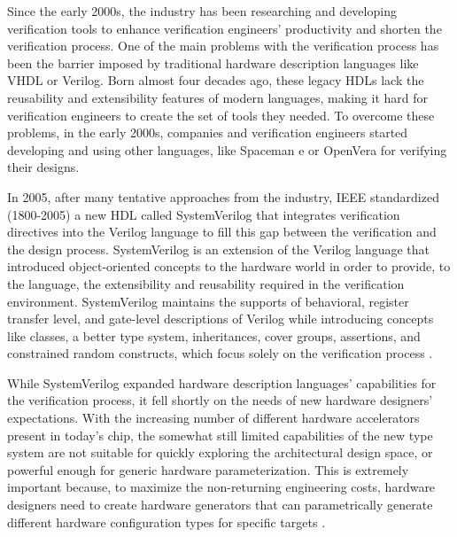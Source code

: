 Since the early 2000s, the industry has been researching and developing
verification tools to enhance verification engineers' productivity and shorten
the verification process. One of the main problems with the verification process
has been the barrier imposed by traditional hardware description languages like
VHDL or Verilog. Born almost four decades ago, these legacy HDLs lack the
reusability and extensibility features of modern languages, making it hard for
verification engineers to create the set of tools they needed. To overcome these
problems, in the early 2000s, companies and verification engineers started
developing and using other languages, like Spaceman e \cite{ieee-e2019} or
OpenVera \cite{openverapapaer} for verifying their designs.

In 2005, after many tentative approaches from the industry, IEEE standardized
(1800-2005) a new HDL called SystemVerilog that integrates verification
directives into the Verilog language to fill this gap between the verification
and the design process. SystemVerilog is an extension of the Verilog language
that introduced object-oriented concepts to the hardware world in order to
provide, to the language, the extensibility and reusability required in the
verification environment. SystemVerilog maintains the supports of behavioral,
register transfer level, and gate-level descriptions of Verilog while
introducing concepts like classes, a better type system, inheritances, cover
groups, assertions, and constrained random constructs, which focus solely on the
verification process \cite{sutherland2003overview}.


While SystemVerilog expanded hardware description languages' capabilities for
the verification process, it fell shortly on the needs of new hardware
designers' expectations. With the increasing number of different hardware
accelerators present in today's chip, the somewhat still limited capabilities of
the new type system are not suitable for quickly exploring the architectural
design space, or powerful enough for generic hardware parameterization. This is
extremely important because, to maximize the non-returning engineering costs,
hardware designers need to create hardware generators that can parametrically
generate different hardware configuration types for specific targets
\cite{whydesingmustchange}.

